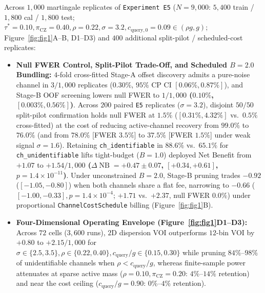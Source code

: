 \documentclass[11pt]{article}
\theoremstyle{remark}
\begin{document}
Across $1{,}000$ martingale replicates of \texttt{Experiment E5} ($N=9{,}000$: $5{,}400$ train / $1{,}800$ cal / $1{,}800$ test; $\tau^*=0.10, \pi_{\text{CZ}}=0.40, \rho=0.22, \sigma=3.2, c_{\text{query},0}=0.09 \in (\rho g, g)$; Figure~\ref{fig:fig1}A--B, D1--D3) and $400$ additional split-pilot / scheduled-cost replicates:
\begin{itemize}
  \item \textbf{Null FWER Control, Split-Pilot Trade-Off, and Scheduled $B=2.0$ Bundling:} $4$-fold cross-fitted Stage-A offset discovery admits a pure-noise channel in $3/1{,}000$ replicates ($0.30\%$, $95\%$ CP CI $[0.06\%, 0.87\%]$), and Stage-B OOF screening lowers null FWER to \textbf{$1/1{,}000$ ($0.10\%$, $[0.003\%, 0.56\%]$)}. Across $200$ paired \texttt{E5} replicates ($\sigma=3.2$), disjoint $50/50$ split-pilot confirmation holds null FWER at $1.5\%$ ($[0.31\%, 4.32\%]$ vs.\ $0.5\%$ cross-fitted) at the cost of reducing active-channel recovery from $99.0\%$ to $76.0\%$ (and from $78.0\%$ [FWER $3.5\%$] to $37.5\%$ [FWER $1.5\%$] under weak signal $\sigma=1.6$). Retaining \texttt{ch\_identifiable} in $88.6\%$ vs.\ $65.1\%$ for \texttt{ch\_unidentifiable} lifts tight-budget ($B=1.0$) deployed Net Benefit from $+1.07$ to \textbf{$+1.54/1{,}000$ ($\Delta\operatorname{NB} = +0.47 \pm 0.07$, $[+0.34, +0.61]$, $p=1.4\times 10^{-11}$)}. Under unconstrained $B=2.0$, Stage-B pruning trades $-0.92$ ($[-1.05, -0.80]$) when both channels share a flat fee, narrowing to $\mathbf{-0.66}$ ($[-1.00, -0.33], p=1.4\times 10^{-4}$; $+1.71$ vs.\ $+2.37$, null FWER $0.0\%$) under proportional \texttt{ChannelCostSchedule} billing (Figure~\ref{fig:fig1}B).
  \item \textbf{Four-Dimensional Operating Envelope (Figure~\ref{fig:fig1}D1--D3):} Across $72$ cells ($3{,}600$ runs), $2\text{D}$ dispersion VOI outperforms $12$-bin VOI by $+0.80$ to $+2.15/1{,}000$ for $\sigma \in \{2.5, 3.5\}, \rho \in \{0.22, 0.40\}, c_{\text{query}}/g \in \{0.15, 0.30\}$ while pruning $84\%\text{--}98\%$ of unidentifiable channels when $\rho < c_{\text{query}}/g$, whereas finite-sample power attenuates at sparse active mass ($\rho=0.10, \pi_{\text{CZ}}=0.20$: $4\%\text{--}14\%$ retention) and near the cost ceiling ($c_{\text{query}}/g=0.90$: $0\%\text{--}4\%$ retention).
\end{itemize}
\end{document}
